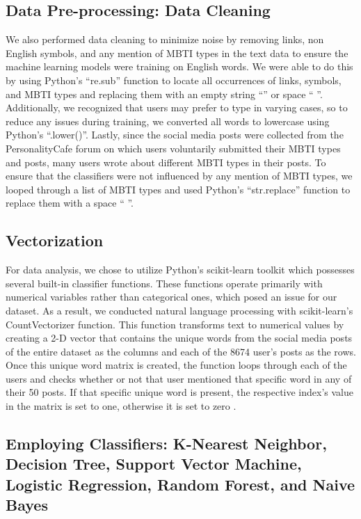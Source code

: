\documentclass{article}
\begin{document}
\subsection{Data Pre-processing: Data Cleaning}

We also performed data cleaning to minimize noise by removing links, non English symbols, and any mention of MBTI types in the text data to ensure the machine learning models were training on English words. We were able to do this by using Python’s “re.sub” function to locate all occurrences of links, symbols, and MBTI types and replacing them with an empty string “” or space “ ”. Additionally, we recognized that users may prefer to type in varying cases, so to reduce any issues during training, we converted all words to lowercase using Python’s “.lower()”. Lastly, since the social media posts were collected from the PersonalityCafe forum on which users voluntarily submitted their MBTI types and posts, many users wrote about different MBTI types in their posts. To ensure that the classifiers were not influenced by any mention of MBTI types, we looped through a list of MBTI types and used Python’s “str.replace” function to replace them with a space “ ”.

\subsection{Vectorization}

For data analysis, we chose to utilize Python’s scikit-learn toolkit which possesses several built-in classifier functions. These functions operate primarily with numerical variables rather than categorical ones, which posed an issue for our dataset. As a result, we conducted natural language processing with scikit-learn’s CountVectorizer function. This function transforms text to numerical values by creating a 2-D vector that contains the unique words from the social media posts of the entire dataset as the columns and each of the 8674 user’s posts as the rows. Once this unique word matrix is created, the function loops through each of the users and checks whether or not that user mentioned that specific word in any of their 50 posts. If that specific unique word is present, the respective index’s value in the matrix is set to one, otherwise it is set to zero \cite{using22}. 

\subsection{Employing Classifiers: K-Nearest Neighbor, Decision Tree, Support Vector Machine, Logistic Regression, Random Forest, and Naive Bayes}
\end{document}
